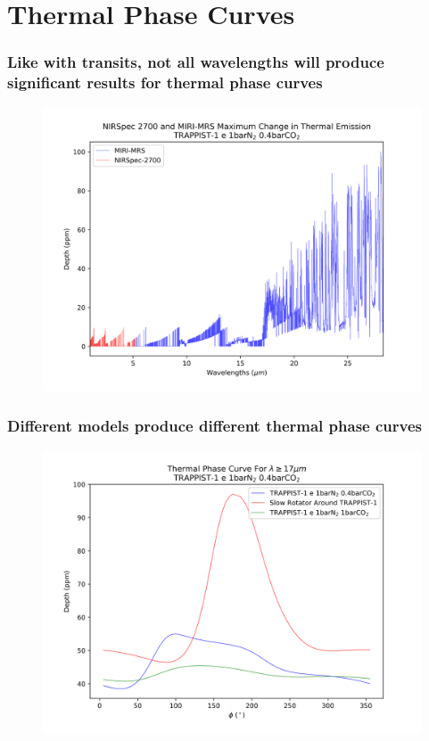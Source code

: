 \documentclass{beamer}
\begin{document}
\begin{frame}
\begin{columns}
\begin{figure}
        \end{figure}
    \end{columns}
\end{frame}

\section{Thermal Phase Curves}
\begin{frame}
    \frametitle{Like with transits, not all wavelengths will produce significant
    results for thermal phase curves}
    \begin{figure}
        \includegraphics[height=0.9\textheight]{tpc/tpc_max_diff.png}
    \end{figure}
\end{frame}

\begin{frame}
    \frametitle{Different models produce different thermal phase curves}
    \begin{figure}
        \includegraphics[height=0.9\textheight]{tpc/thermal_phase_curve.png}
    \end{figure}
\end{frame}
\end{document}
